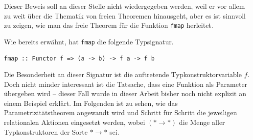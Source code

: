 Dieser Beweis soll an dieser Stelle nicht wiedergegeben werden, weil er vor allem zu weit über die Thematik von freien Theoremen
hinausgeht, aber es ist sinnvoll zu zeigen, wie man das freie Theorem für die Funktion \texttt{fmap} herleitet.

Wie bereits erwähnt, hat \texttt{fmap} die folgende Typsignatur.

\begin{verbatim}
fmap :: Functor f => (a -> b) -> f a -> f b
\end{verbatim}

Die Besonderheit an dieser Signatur ist die auftretende Typkonstruktorvariable $f$. Doch nicht minder interessant ist die Tatsache, dass
eine Funktion als Parameter übergeben wird -- dieser Fall wurde in dieser Arbeit bisher noch nicht explizit an einem Beispiel erklärt.
Im Folgenden ist zu sehen, wie das Parametrizitätstheorem angewandt wird und Schritt für Schritt die jeweiligen relationalen Aktionen
eingesetzt werden, wobei $(* \rightarrow *)$ die Menge aller Typkonstruktoren der Sorte $* \rightarrow *$ sei.


